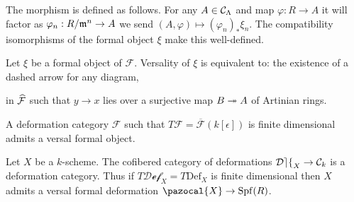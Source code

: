 \documentclass[12pt]{article}
\newcommand{\Def}{\mathrm{Def}}
\newcommand{\cDef}{\mathcal{Def}}
\renewcommand{\X}{\pazocal{X}}
\newcommand{\Spf}[1]{\mathrm{Spf} \! \left(#1 \right)}
\renewcommand{\F}{\mathcal{F}}
\begin{document}
\begin{rmk}
The morphism is defined as follows. For any $A \in \mathcal{C}_{\Lambda}$ and map $\varphi : R \to A$ it will factor as $\varphi_n : R / \mathfrak{m}^n \to A$ we send $(A, \varphi) \mapsto (\varphi_n)_* \xi_n$. The compatibility isomorphisms of the formal object $\xi$ make this well-defined. 
\end{rmk}

\begin{rmk}
Let $\xi$ be a formal object of $\F$. Versality of $\xi$ is equivalent to: the existence of a dashed arrow for any diagram,
\begin{center}
\end{center}
in $\wh{\F}$ such that $y \to x$ lies over a surjective map $B \twoheadrightarrow A$ of Artinian rings. 
\end{rmk}

\begin{theorem}
A deformation category $\F$ such that $T \F = \overline{\F}(k[\epsilon])$ is finite dimensional admits a versal formal object.
\end{theorem}

\begin{example}
Let $X$ be a $k$-scheme. The cofibered category of deformations $\cDef_X \to \C_{k}$ is a deformation category. Thus if $T \cDef_X = T \Def_X$ is finite dimensional then $X$ admits a versal formal deformation $\X \to \Spf{R}$.
\end{example}
\end{document}
